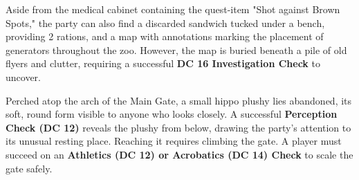 {\noindent\entryfont Aside from the medical cabinet containing the quest-item "Shot against Brown Spots," the party can also find a discarded sandwich tucked under a bench, providing 2 rations, and a map with annotations marking the placement of generators throughout the zoo. However, the map is buried beneath a pile of old flyers and clutter, requiring a successful \textbf{DC 16 Investigation Check} to uncover.

Perched atop the arch of the Main Gate, a small hippo plushy lies abandoned, its soft, round form visible to anyone who looks closely. A successful \textbf{Perception Check (DC 12)} reveals the plushy from below, drawing the party's attention to its unusual resting place. Reaching it requires climbing the gate. A player must succeed on an \textbf{Athletics (DC 12) or Acrobatics (DC 14) Check} to scale the gate safely.}

